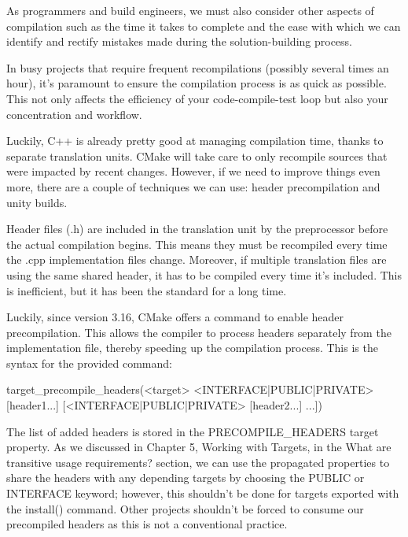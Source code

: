 
As programmers and build engineers, we must also consider other aspects of compilation such as the time it takes to complete and the ease with which we can identify and rectify mistakes made during the solution-building process.


In busy projects that require frequent recompilations (possibly several times an hour), it’s paramount to ensure the compilation process is as quick as possible. This not only affects the efficiency of your code-compile-test loop but also your concentration and workflow.

Luckily, C++ is already pretty good at managing compilation time, thanks to separate translation units. CMake will take care to only recompile sources that were impacted by recent changes. However, if we need to improve things even more, there are a couple of techniques we can use: header precompilation and unity builds.


Header files (.h) are included in the translation unit by the preprocessor before the actual compilation begins. This means they must be recompiled every time the .cpp implementation files change. Moreover, if multiple translation files are using the same shared header, it has to be compiled every time it’s included. This is inefficient, but it has been the standard for a long time.

Luckily, since version 3.16, CMake offers a command to enable header precompilation. This allows the compiler to process headers separately from the implementation file, thereby speeding up the compilation process. This is the syntax for the provided command:

\begin{shell}
target_precompile_headers(<target>
                          <INTERFACE|PUBLIC|PRIVATE> [header1...]
                         [<INTERFACE|PUBLIC|PRIVATE> [header2...]
...])
\end{shell}

The list of added headers is stored in the PRECOMPILE\_HEADERS target property. As we discussed in Chapter 5, Working with Targets, in the What are transitive usage requirements? section, we can use the propagated properties to share the headers with any depending targets by choosing the PUBLIC or INTERFACE keyword; however, this shouldn’t be done for targets exported with the install() command. Other projects shouldn’t be forced to consume our precompiled headers as this is not a conventional practice.

